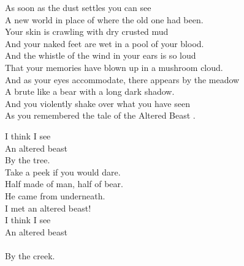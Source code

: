 
\label{album:murder-of-the-universe}





As soon as the dust settles you can see \\
A new world in place of where the old one had been. \\

Your skin is crawling with dry crusted mud \\
And your naked feet are wet in a pool of your blood. \\

And the whistle of the wind in your ears is so loud \\
That your memories have blown up in a mushroom cloud. \\

And as your eyes accommodate, there appears by the meadow \\
A brute like a bear with a long dark shadow. \\

And you violently shake over what you have seen \\
As you remembered the tale of the Altered Beast . \\





I think I see \\
An altered beast \\
By the tree. \\

Take a peek if you would dare. \\
Half made of man, half of bear. \\

He came from underneath. \\
I met an altered beast! \\

I think I see \\
An altered beast \\ \\
By the creek. \\

